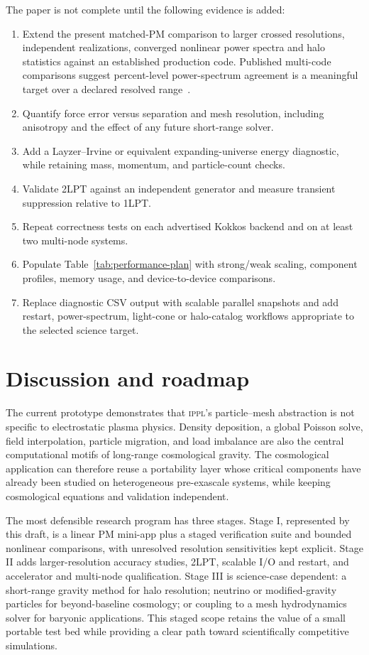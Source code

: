 \documentclass[11pt]{article}
\newcommand{\IPPL}{\textnormal{\textsc{ippl}}\xspace}
\begin{document}
The paper is not complete until the following evidence is added:
\begin{enumerate}
  \item Extend the present matched-PM comparison to larger crossed resolutions,
        independent realizations, converged nonlinear power spectra and halo
        statistics against an established production code.  Published
        multi-code comparisons suggest percent-level power-spectrum agreement is
        a meaningful target over a declared resolved range~\cite{angulo2022review}.
  \item Quantify force error versus separation and mesh resolution, including
        anisotropy and the effect of any future short-range solver.
  \item Add a Layzer--Irvine or equivalent expanding-universe energy diagnostic,
        while retaining mass, momentum, and particle-count checks.
  \item Validate 2LPT against an independent generator and measure transient
        suppression relative to 1LPT.
  \item Repeat correctness tests on each advertised Kokkos backend and on at
        least two multi-node systems.
  \item Populate Table~\ref{tab:performance-plan} with strong/weak scaling,
        component profiles, memory usage, and device-to-device comparisons.
  \item Replace diagnostic CSV output with scalable parallel snapshots and add
        restart, power-spectrum, light-cone or halo-catalog workflows appropriate
        to the selected science target.
\end{enumerate}

\section*{Discussion and roadmap}

The current prototype demonstrates that \IPPL's particle--mesh abstraction is
not specific to electrostatic plasma physics.  Density deposition, a global
Poisson solve, field interpolation, particle migration, and load imbalance are
also the central computational motifs of long-range cosmological gravity.  The
cosmological application can therefore reuse a portability layer whose critical
components have already been studied on heterogeneous pre-exascale systems,
while keeping cosmological equations and validation independent.

The most defensible research program has three stages.  Stage I, represented by
this draft, is a linear PM mini-app plus a staged verification suite and bounded
nonlinear comparisons, with unresolved resolution sensitivities kept explicit.
Stage II adds larger-resolution accuracy studies, 2LPT, scalable I/O and restart,
and accelerator and multi-node qualification.  Stage III is science-case dependent: a
short-range gravity method for halo resolution; neutrino or modified-gravity
particles for beyond-baseline cosmology; or coupling to a mesh hydrodynamics
solver for baryonic applications.  This staged scope retains the value of a
small portable test bed while providing a clear path toward scientifically
competitive simulations.
\end{document}
